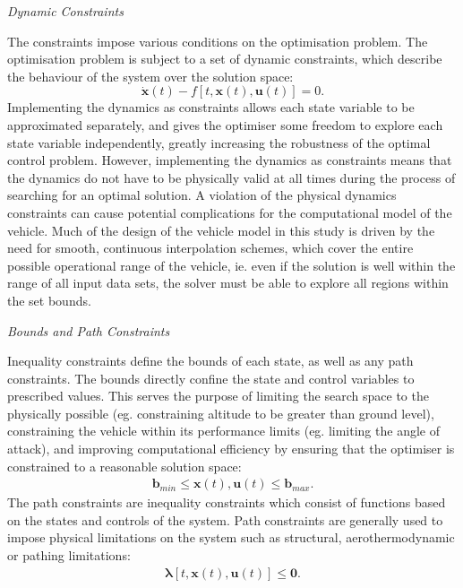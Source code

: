 \noindent \textit{Dynamic Constraints}

\noindent The constraints impose various conditions on the optimisation problem.
The optimisation problem is subject to a set of dynamic constraints, which describe the behaviour of the system over the solution space:
\begin{equation} \label{eq:state}
\dot{\textbf{x}}(t) - f[t,\textbf{x}(t),\textbf{u}(t)] = 0.
\end{equation}
Implementing the dynamics as constraints allows each state variable to be approximated separately, and gives the optimiser some freedom to explore each state variable independently, greatly increasing the robustness of the optimal control problem. However, implementing the dynamics as constraints means that the dynamics do not have to be physically valid at all times during the process of searching for an optimal solution. A violation of the physical dynamics constraints can cause potential complications for the computational model of the vehicle. Much of the design of the vehicle model in this study is driven by the need for smooth, continuous interpolation schemes, which cover the entire possible operational range of the vehicle, ie. even if the solution is well within the range of all input data sets, the solver must be able to explore all regions within the set bounds. 

\noindent \textit{Bounds and Path Constraints}

\noindent Inequality constraints define the bounds of each state, as well as any path constraints.
The bounds directly confine the state and control variables to prescribed values. This serves the purpose of limiting the search space to the physically possible (eg. constraining altitude to be greater than ground level), constraining the vehicle within its performance limits (eg. limiting the angle of attack), and improving computational efficiency by ensuring that the optimiser is constrained to a reasonable solution space:
\begin{eqnarray}
\mathbf{b}_{min} \leq \textbf{x}(t),\textbf{u}(t) \leq \mathbf{b}_{max}.
\end{eqnarray}
The path constraints are inequality constraints which consist of functions based on the states and controls of the system. Path constraints are generally used to impose physical limitations on the system such as structural, aerothermodynamic or pathing limitations:
\begin{eqnarray}
\mathbf{\lambda}[t,\textbf{x}(t),\textbf{u}(t)] \leq \textbf{0}.
\end{eqnarray}

